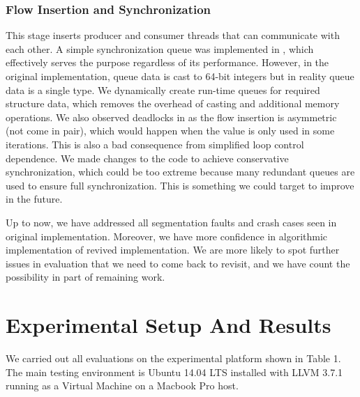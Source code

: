 \documentclass[letterpaper, 10 pt, conference]{ieeeconf}  %
\begin{document}
\subsubsection{Flow Insertion and Synchronization}

This stage inserts producer and consumer threads that can communicate with each other. A simple synchronization queue was implemented in \cite{c2}, which effectively serves the purpose regardless of its performance. However, in the original implementation, queue data is cast to 64-bit integers but in reality queue data is a single type. We dynamically create run-time queues for required structure data, which removes the overhead of casting and additional memory operations. 
We also observed deadlocks in \cite{c2} as the flow insertion is asymmetric (not come in pair), which would happen when the value is only used in some iterations. This is also a bad consequence from simplified loop control dependence. We made changes to the code to achieve conservative synchronization, which could be too extreme because many redundant queues are used to ensure full synchronization. This is something we could target to improve in the future. 

Up to now, we have addressed all segmentation faults and crash cases seen in original implementation. Moreover, we have more confidence in algorithmic implementation of revived implementation. We are more likely to spot further issues in evaluation that we need to come back to revisit, and we have count the possibility in part of remaining work. 

\section{Experimental Setup And Results}
We carried out all evaluations on the experimental platform shown in Table 1. The main testing environment is Ubuntu 14.04 LTS installed with LLVM 3.7.1 running as a Virtual Machine on a Macbook Pro host. 
\end{document}
